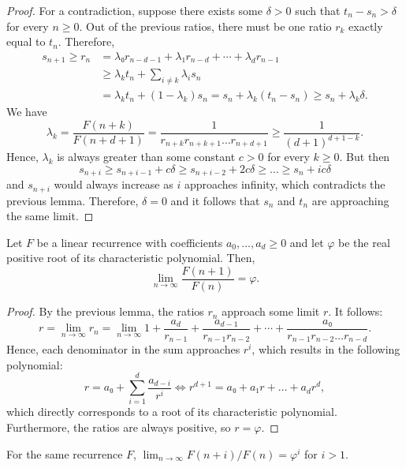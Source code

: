 \begin{proof}
  For a contradiction, suppose there exists some $δ > 0$ such that $t_n - s_n > δ$ for every $n ≥ 0$.
  Out of the previous ratios, there must be one ratio $r_k$ exactly equal to $t_n$.
  Therefore,
  \begin{align*}
    s_{n+1} ≥ r_n & = λ₀ r_{n-d-1} + λ₁ r_{n-d} + ⋯ + λ_d r_{n-1} \\
                  & ≥ λ_k t_n + \sum_{i ≠ k} λ_i s_n \\
                  & = λ_k t_n + (1 - λ_k) s_n = s_n + λ_k (t_n - s_n) ≥ s_n + λ_k δ.
  \end{align*}
  We have
  \[
    λ_k = \frac{F(n+k)}{F(n+d+1)} = \frac{1}{r_{n+k} r_{n+k+1} \dots r_{n+d+1}} ≥ \frac{1}{(d+1)^{d+1-k}}.
  \]
  Hence, $λ_k$ is always greater than some constant $c > 0$ for every $k ≥ 0$.
  But then
  \[
    s_{n+i} ≥ s_{n+i-1} + c δ ≥ s_{n+i-2} + 2c δ ≥ \dots ≥ s_n + i c δ
  \]
  and $s_{n+i}$ would always increase as $i$ approaches infinity,
  which contradicts the previous lemma.
  Therefore, $δ = 0$ and it follows that $s_n$ and $t_n$ are approaching the same limit.
\end{proof}

\begin{theorem}
  Let $F$ be a linear recurrence with coefficients $a_0, \dots, a_d ≥ 0$
  and let $φ$ be the real positive root of its characteristic polynomial.
  Then,
  \[
    \lim_{n \to \infty} \frac{F(n + 1)}{F(n)} = φ.
  \]
\end{theorem}

\begin{proof}
  By the previous lemma, the ratios $r_n$ approach some limit $r$. It follows:
  \[
    r
    = \lim_{n → ∞} r_n
    = \lim_{n → ∞} 1 + \frac{a_d}{r_{n-1}} + \frac{a_{d-1}}{r_{n-1} r_{n-2}} + ⋯ + \frac{a₀}{r_{n-1} r_{n-2} \dots r_{n-d}}.
  \]
  Hence, each denominator in the sum approaches $r^i$,
  which results in the following polynomial:
  \[
    r = a₀ + \sum_{i = 1}^d \frac{a_{d - i}}{r^i}
    \iff
    r^{d+1} = a₀ + a₁ r + \dots + a_d r^d,
  \]
  which directly corresponds to a root of its characteristic polynomial.
  Furthermore, the ratios are always positive, so $r = φ$.
\end{proof}

\begin{corollary}
  For the same recurrence $F$, $\lim_{n → ∞} F(n + i) / F(n) = φ^i$ for $i > 1$.
\end{corollary}

